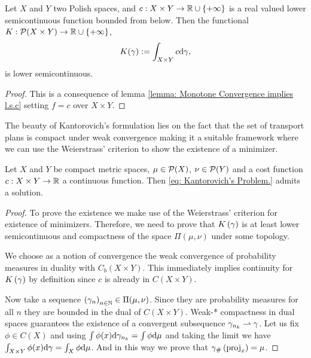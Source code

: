 \begin{theorem}
	Let $X$ and $Y$ two Polish spaces, and $c:X\times Y\rightarrow\mathbb{R}\cup\left\lbrace +\infty \right\rbrace$ is a real valued lower semicontinuous function bounded from below. Then the functional $K:\mathcal{P}(X\times Y)\rightarrow \mathbb{R}\cup\left\lbrace +\infty \right\rbrace$, 
	\begin{equation}
	K(\gamma):=\int_{X\times Y}c\mathrm{d}\gamma,
	\end{equation}
	is lower semicontinuous. \label{th: l.s.c of c.}
	\begin{proof}
		This is a consequence of lemma \ref{lemma: Monotone Convergence implies l.s.c} setting $f=c$ over $X\times Y$.
	\end{proof}

The beauty of Kantorovich's formulation lies on the fact that the set of transport plans is compact under weak convergence making it a suitable framework where we can use the Weierstrass' criterion to show the existence of a minimizer. 

\begin{theorem} Let $X$ and $Y$ be compact metric spaces, $\mu \in \mathcal{P}(X)$, $\nu \in \mathcal{P}(Y)$ and a cost function $c: X\times Y \rightarrow \mathbb{R}$ a continuous function. Then \eqref{eq: Kantorovich's Problem.} admits a solution.
\end{theorem}
\begin{proof}
	To prove the existence we make use of the Weierstrass’ criterion for existence of minimizers. Therefore, we need to prove that $K\left(\gamma\right)$ is at least lower semicontinuous and compactness of the space $\Pi(\mu, \nu)$ under some topology. 
	
	We choose as a notion of convergence the weak convergence of probability measures in duality with $C_b(X\times Y)$. This immediately implies continuity for $K\left(\gamma\right)$ by definition since $c$ is already in $C(X\times Y)$. 
	
	Now take a sequence $\left( \gamma_n \right)_{n\in\mathbb{N}} \in \Pi(\mu, \nu)$. Since they are probability measures for all $n$ they are bounded in the dual of $C(X\times Y)$. Weak-* compactness in dual spaces guarantees the existence of a convergent subsequence $\gamma_{n_k} \rightharpoonup \gamma$. Let us fix $\phi \in C(X)$ and using $\int\phi(x) \mathrm{d} \gamma_{n_k}=\int \phi \mathrm{d}\mu$ and taking the limit we have $\int_{X\times Y}\phi(x) \mathrm{d} \gamma=\int_{X} \phi \mathrm{d}\mu$. And in this way we prove that ${\gamma}_{\#} \left( \mathrm{proj}_x \right)=\mu$. 
	

\end{proof}
\end{theorem}
